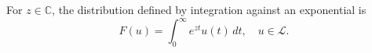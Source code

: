 For $z \in \mathbb{C}$, the distribution defined by integration against an exponential is
$$F(u) = \int_0^\infty e^{zt} u(t) \, dt, \quad u \in \mathcal{L}.$$
